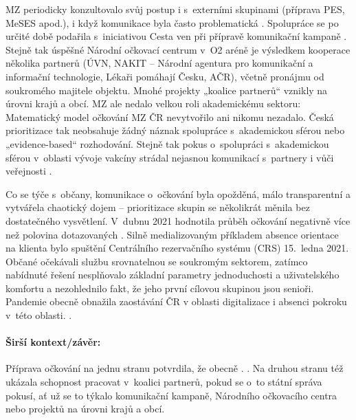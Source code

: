 MZ periodicky konzultovalo svůj postup i s~externími skupinami (příprava PES, MeSES apod.), i když komunikace byla často problematická \cite{irozhlas_smejkalovu_2021, jerabkova_smejkal_2021}. Spolupráce se po určité době podařila s~iniciativou Cesta ven při přípravě komunikační kampaně \cite{mudrochova_kampan_2020}. Stejně tak úspěšné Národní očkovací centrum v~O2 aréně je výsledkem kooperace několika partnerů (ÚVN, NAKIT -- Národní agentura pro komunikační a informační technologie, Lékaři pomáhají Česku, AČR), včetně pronájmu od soukromého majitele objektu. Mnohé projekty „koalice partnerů“ vznikly na úrovni krajů a obcí. MZ ale nedalo velkou roli akademickému sektoru: Matematický model očkování MZ ČR nevytvořilo ani nikomu nezadalo. Česká prioritizace \cite{strategie_ockovani_mzcr_2020} tak neobsahuje žádný náznak spolupráce s~akademickou sférou nebo „evidence-based“ rozhodování. Stejně tak pokus o~spolupráci s~akademickou sférou v~oblasti vývoje vakcíny strádal nejasnou komunikací s~partnery i vůči veřejnosti \cite{bezdekova_ceska_2021}.

Co se týče  s~občany, komunikace o~očkování byla opožděná, málo transparentní a vytvářela chaotický dojem -- prioritizace skupin se několikrát měnila bez dostatečného vysvětlení. V~dubnu 2021 hodnotila průběh očkování negativně více než polovina dotazovaných \cite{cvvm_verejnost_ockovani_2021}. Silně medializovaným příkladem absence orientace na klienta bylo spuštění Centrálního rezervačního systému (CRS) 15.~ledna 2021. Občané očekávali službu srovnatelnou se soukromým sektorem, zatímco nabídnuté řešení nesplňovalo základní parametry jednoduchosti a uživatelského komfortu \cite{blaha_registrace_2021} a nezohlednilo fakt, že jeho první cílovou skupinou jsou senioři. Pandemie obecně obnažila zaostávání ČR v oblasti digitalizace \cite{usela_pres_2021} i absenci pokroku v~této oblasti. \cite{european_comission_desi_2020, hlidac_nedigitalni_2021}.

\paragraph{Širší kontext/závěr:} Příprava očkování na jednu stranu potvrdila, že obecně . \cite{hudema_hudema_2021}. Na druhou stranu též ukázala schopnost pracovat v~koalici partnerů, pokud se o~to státní správa pokusí, ať už se to týkalo komunikační kampaně, Národního očkovacího centra nebo projektů na úrovni krajů a obcí.

